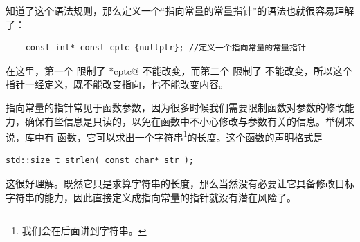 知道了这个语法规则，那么定义一个``指向常量的常量指针''的语法也就很容易理解了：
\begin{lstlisting}
    const int* const cptc {nullptr}; //定义一个指向常量的常量指针
\end{lstlisting}
在这里，第一个 \lstinline@const@ 限制了 \lstinline@*cptc@ 不能改变，而第二个 \lstinline@const@ 限制了 \lstinline@cptc@ 不能改变，所以这个指针一经定义，既不能改变指向，也不能改变内容。\par
指向常量的指针常见于函数参数，因为很多时候我们需要限制函数对参数的修改能力，确保有些信息是只读的，以免在函数中不小心修改与参数有关的信息。举例来说，\lstinline@cstring@ 库中有 \lstinline@strlen@ 函数，它可以求出一个字符串\footnote{我们会在后面讲到字符串。}的长度。这个函数的声明格式是
\begin{lstlisting}
std::size_t strlen( const char* str );
\end{lstlisting}
这很好理解。既然它只是求算字符串的长度，那么当然没有必要让它具备修改目标字符串的能力，因此直接定义成指向常量的指针就没有潜在风险了。\par
